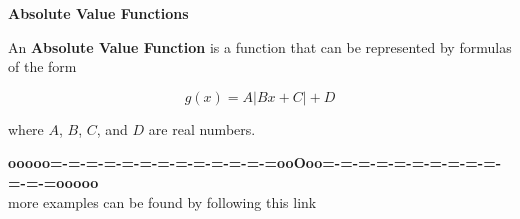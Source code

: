 \documentclass{ximera}
\begin{document}
\begin{definition} \textbf{\textcolor{green!50!black}{Absolute Value Functions}}

An \textbf{Absolute Value Function} is a function that can be represented by formulas of the form

\[     g(x) =    A  | B x + C | + D           \]

where $A$, $B$, $C$, and $D$ are real numbers.


\end{definition}




















\begin{center}
\textbf{\textcolor{green!50!black}{ooooo=-=-=-=-=-=-=-=-=-=-=-=-=ooOoo=-=-=-=-=-=-=-=-=-=-=-=-=ooooo}} \\

more examples can be found by following this link\\ 

\end{center}
\end{document}
